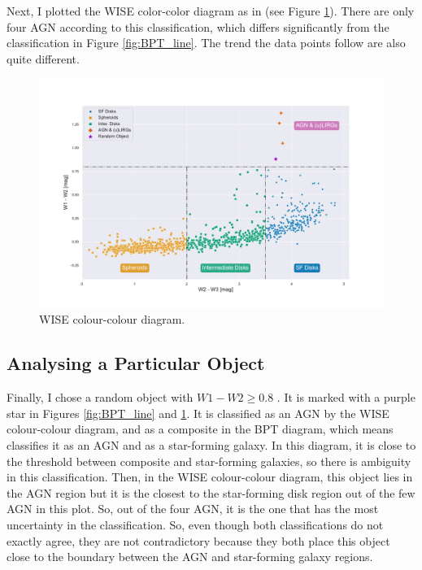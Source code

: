 \documentclass[letterpaper, oneside]{article}
\begin{document}
Next, I plotted the WISE color-color diagram as in \cite{Jarrett_2017} (see Figure \ref{fig:wise_colours}). There are only four AGN according to this classification, which differs significantly from the classification in Figure \ref{fig:BPT_line}. The trend the data points follow are also quite different.

\begin{figure}[h]
	\centering
	\includegraphics[width=1.1\textwidth]{../wise_color_color.pdf}
	\caption{WISE colour-colour diagram.}
	\label{fig:wise_colours}
\end{figure}

\subsection{Analysing a Particular Object}

Finally, I chose a random object with $W1 - W2 \geq 0.8$ \cite{Assef_2013}. It is marked with a purple star in Figures \ref{fig:BPT_line} and \ref{fig:wise_colours}. It is classified as an AGN by the WISE colour-colour diagram, and as a composite in the BPT diagram, which means \cite{Kauffmann_2003} classifies it as an AGN and \cite{Kewley_2001} as a star-forming galaxy. In this diagram, it is close to the threshold between composite and star-forming galaxies, so there is ambiguity in this classification. Then, in the WISE colour-colour diagram, this object lies in the AGN region but it is the closest to the star-forming disk region out of the few AGN in this plot. So, out of the four AGN, it is the one that has the most uncertainty in the classification. So, even though both classifications do not exactly agree, they are not contradictory because they both place this object close to the boundary between the AGN and star-forming galaxy regions.
\end{document}
